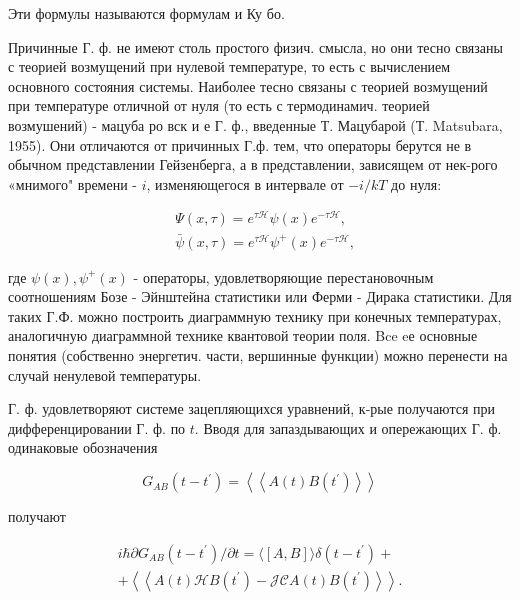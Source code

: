 \documentclass[10pt]{article}
\begin{document}
Эти формулы называются формулам и Ку бо.



Причинные Г. ф. не имеют столь простого физич. смысла, но они тесно связаны с теорией возмущений при нулевой температуре, то есть с вычислением основного состояния системы. Наиболее тесно связаны с теорией возмущений при температуре отличной от нуля (то есть с термодинамич. теорией возмушений) - мацуба ро вск и е Г. ф., введенные Т. Мацубарой (Т. Matsubara, 1955). Они отличаются от причинных Г.ф. тем, что операторы берутся не в обычном представлении Гейзенберга, а в представлении, зависящем от нек-рого «мнимого" времени - $i$, изменяющегося в интервале от $-i / k T$ до нуля:



\[

\begin{aligned}

& \Psi(x, \tau)=e^{\tau \mathscr{H}} \psi(x) e^{-\tau \mathscr{H}}, \\

& \bar{\psi}(x, \tau)=e^{\tau \mathscr{H}} \psi^{+}(x) e^{-\tau \mathscr{H}},

\end{aligned}

\]



где $\psi(x), \psi^{+}(x)$ - операторы, удовлетворяющие перестановочным соотношениям Бозе - Эйнштейна статистики или Ферми - Дирака статистики. Для таких Г.Ф. можно построить диаграммную технику при конечных температурах, аналогичную диаграммной технике квантовой теории поля. Bce eе основные понятия (собственно энергетич. части, вершинные функции) можно перенести на случай ненулевой температуры.



Г. ф. удовлетворяют системе зацепляющихся уравнений, к-рые получаются при дифференцировании Г. ф. по $t$. Вводя для запаздывающих и опережающих Г. ф. одинаковые обозначения



\[

G_{A B}\left(t-t^{\prime}\right)=\left\langle\left\langle A(t) B\left(t^{\prime}\right)\right\rangle\right\rangle

\]



получают



\[

\begin{gathered}

i \hbar \partial G_{A B}\left(t-t^{\prime}\right) / \partial t=\langle[A, B]\rangle \delta\left(t-t^{\prime}\right)+ \\

+\left\langle\left\langle A(t) \mathscr{H} B\left(t^{\prime}\right)-\mathscr{J C} A(t) B\left(t^{\prime}\right)\right\rangle\right\rangle .

\end{gathered}

\]
\end{document}

